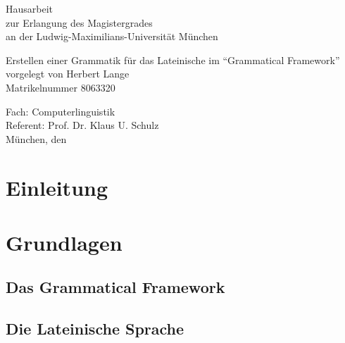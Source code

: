 \documentclass[fontsize=12pt,abstract=on,titlepage,bibliography=totoc,ngerman,listof=totoc]{scrreprt}
\begin{document}
\setcounter{tocdepth}{2}
\date{31.10.2013}
\makeatletter
\begin{titlepage}
{\sffamily
  \begin{center}
    \vspace{4cm}
    \begin{LARGE}
      Hausarbeit \\
      zur Erlangung des Magistergrades \\
      an der Ludwig-Maximilians-Universität München \\[3cm]
    \end{LARGE}
    {\Huge Erstellen einer Grammatik für das Lateinische im "`Grammatical Framework"' \\[4cm] }
    {\LARGE vorgelegt von Herbert Lange \\ Matrikelnummer 8063320 \\[5.5cm] }
  \end{center}
  \parindent0mm
  \begin{LARGE} 
    Fach: Computerlinguistik  \\[0.5cm]
    Referent: Prof. Dr. Klaus U. Schulz \\[0.5cm]
    München, den \@date 
  \end{LARGE}
}
\end{titlepage}

\makeatother
\tableofcontents
\clearpage
\setcounter{page}{1}
\chapter{Einleitung}
\label{chap:einleitung}

\chapter{Grundlagen}
\label{chap:grundlagen}
\section{Das Grammatical Framework}
\label{sec:gf}

\pagebreak
\FloatBarrier
\section{Die Lateinische Sprache}
\label{sec:latein}

\pagebreak
\FloatBarrier
\end{document}
